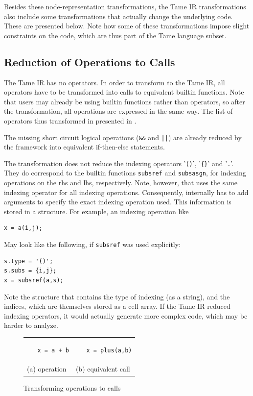 Besides these node-representation transformations, the Tame IR transformations
also include some transformations that actually change the underlying
\matlab code. These are presented below. Note how some of these transformations
impose slight constraints on the \matlab code, which are thus part of the 
Tame \matlab language subset.


\newpage
\subsection{Reduction of Operations to Calls}

The Tame IR has no operators. In order to transform to the Tame IR, all operators
have to be transformed into calls to equivalent builtin functions.
Note that users may already be using builtin functions rather than operators, so
after the transformation, all operations are expressed in the same way.
The list of operators thus transformed in presented in .

The missing short circuit logical operations ({\tt \&\&} and {\tt ||}) are already reduced by the
\mcsaf framework into equivalent if-then-else statements.

The transformation does not reduce the indexing operators '{\tt ()}',
'{\tt \{\}}' and '{\tt .}'.  They do correspond to the builtin
functions {\tt subsref} and {\tt subsasgn}, for indexing operations on the
rhs and lhs, respectively. Note, however, that \matlab uses the same
indexing operator for all indexing operations.  Consequently, \matlab
internally has to add arguments to specify the exact indexing
operation used. This information is stored in a structure. 
For example, an indexing operation like
\vspace{-.5cm}
\begin{lstlisting}
x = a(i,j);
\end{lstlisting}
May look like the following, if {\tt subsref} was used explicitly:
\vspace{-.5cm}
\begin{lstlisting}
s.type = '()';
s.subs = {i,j};
x = subsref(a,s);
\end{lstlisting}
Note the structure that contains the type of indexing (as a string),
and the indices, which are themselves stored as a cell array.
If the Tame IR reduced indexing operators, it would actually generate
more complex code, which may be harder to analyze.

\begin{figure}[htbp]
\begin{center}
\begin{tabular}{p{2.2in} p{3in}}
\begin{lstlisting}
   x = a + b
\end{lstlisting}
&
\begin{lstlisting}
   x = plus(a,b)
\end{lstlisting}
\\
(a) operation & (b) equivalent call 
\end{tabular}
\caption{Transforming operations to calls } \label{Fig:Lambda}
\end{center}
\end{figure}


